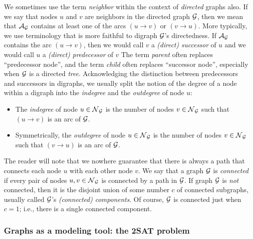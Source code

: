We sometimes use the term {\it neighbor} within the context of {\em
  directed} graphs also.  If we say that nodes $u$ and $v$ are
neighbors in the directed graph $\mbox{$\cal G$}$,
then we mean that $\mbox{$\cal A$}_{\mbox{{\scriptsize $\cal G$}}}$ contains at least one of the arcs $(u
  \rightarrow v)$ or $(v \rightarrow u)$.  More typically, we use
  terminology that is more faithful to digraph $\mbox{$\cal G$}$'s directedness.
If $\mbox{$\cal A$}_{\mbox{{\scriptsize $\cal G$}}}$ contains the arc $(u \rightarrow v)$, then we would call
  $v$ a {\it (direct) successor} of $u$
and we would call $u$ a {\it (direct) predecessor} of $v$
The term {\it parent} often replaces ``predecessor node'', and the
term {\it child} often replaces ``successor node'', especially when
$\mbox{$\cal G$}$ is a directed {\em tree}.  Acknowledging the distinction between
predecessors and successors in digraphs, we usually split the notion
of the degree of a node within a digraph into the {\it indegree} and
the {\it outdegree} of node $u$:
\begin{itemize}
\item
The {\it indegree} of node $u \in \mbox{$\cal N$}_{\mbox{{\scriptsize $\cal G$}}}$
is the number of nodes $v \in \mbox{$\cal N$}_{\mbox{{\scriptsize $\cal G$}}}$ such that $(u \rightarrow v)$
is an arc of $\mbox{$\cal G$}$.
\item
Symmetrically, the {\it outdegree} of node $u \in \mbox{$\cal N$}_{\mbox{{\scriptsize $\cal G$}}}$
is the number of nodes $v \in \mbox{$\cal N$}_{\mbox{{\scriptsize $\cal G$}}}$ such that $(v \rightarrow u)$
is an arc of $\mbox{$\cal G$}$.
\end{itemize}

\smallskip

The reader will note that we nowhere guarantee that there is always a
path that connects each node $u$ with each other node $v$.  We say
that a graph $\mbox{$\cal G$}$ is {\it connected}  if every
pair of nodes $u, v \in \mbox{$\cal N$}_{\mbox{{\scriptsize $\cal G$}}}$ is connected by a path in $\mbox{$\cal G$}$.  If
graph $\mbox{$\cal G$}$ is {\em not} connected, then it is the disjoint union of
some number $c$ of connected subgraphs, usually called $\mbox{$\cal G$}$'s {\it
  (connected) components}.   Of
course, $\mbox{$\cal G$}$ is connected just when $c=1$; i.e., there is a single
connected component.



\subsubsection{Graphs as a modeling tool: the {\sf 2SAT} problem}
\label{sec:graph-model-2SAT}

